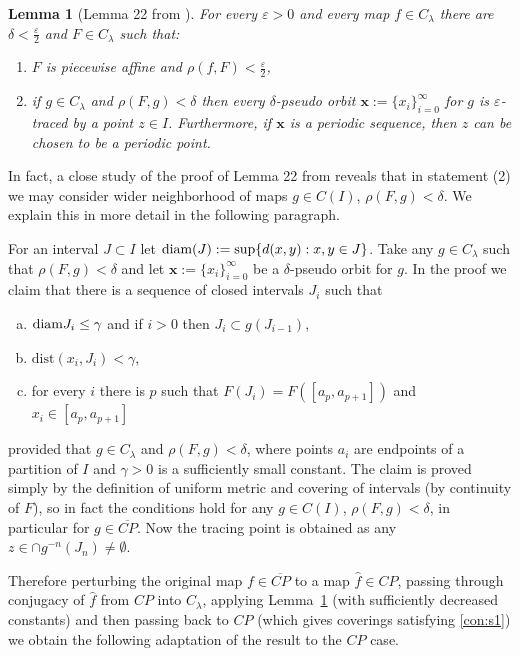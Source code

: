 \documentclass[12pt, a4paper]{amsart}
\newtheorem{lemma}[theorem]{Lemma}
\def\eps{\varepsilon}
\def\diam{\mbox{\rm diam} }
\newcommand{\?}{{\bf ???}}
\def\CP{\overline{CP}}
\begin{document}
\begin{lemma}[Lemma 22 from \cite{BCOT}]\label{lem:shadowingdense}
For every $\eps>0$ and every map $f\in C_\lambda$
 there are
$\delta<\frac{\eps}{2}$ and $F\in C_{\lambda}$ such that:
\begin{enumerate}
\item $F$ is piecewise affine and $\rho(f,F)<\frac{\eps}{2}$,
\item if $g\in C_\lambda$ and $\rho(F,g)<\delta$ then every $\delta$-pseudo orbit $\mathbf{x}:=\{x_i\}_{i=0}^\infty$ for $g$ is $\eps$-traced by a point $z\in I$.
Furthermore, if $\mathbf{x}$ is a periodic sequence, then $z$ can be chosen to be a periodic point.
\end{enumerate}
\end{lemma}

In fact, a close study of the proof  of Lemma 22 from \cite{BCOT} reveals that in statement (2) we may consider wider neighborhood of maps $g\in C(I)$, $\rho(F,g)<\delta$. We explain this in more detail in the following paragraph.

For an interval $J\subset I$ let $\diam(J):=\sup\{d(x,y): x,y\in J\}$.
Take any $g\in C_\lambda$ such that $\rho(F,g)<\delta$ and let $\mathbf{x}:=\{x_i\}_{i=0}^\infty$ be a $\delta$-pseudo orbit for $g$. In the proof we claim that there is a sequence of closed intervals $J_i$ such that
\begin{enumerate}[(a)]
\item $\diam J_i \leq \gamma$ and if $i>0$ then $J_{i}\subset g(J_{i-1})$,\label{con:s1}
\item $\mathrm{dist}(x_{i},J_i)< \gamma$,\label{con:s2}
\item\label{c:3} for every $i$ there is $p$ such that $F(J_i)=F([a_p,a_{p+1}])$ and $x_i\in [a_p,a_{p+1}]$\label{con:s3}
\end{enumerate}
provided that $g\in C_\lambda$ and $\rho(F,g)<\delta$,
where points $a_i$ are endpoints of a partition of $I$ and $\gamma>0$ is a sufficiently small constant.
The claim is proved simply by the definition of uniform metric and covering of intervals (by continuity of $F$), so in fact the conditions hold for any 
$g\in C(I)$, $\rho(F,g)<\delta$, in particular for $g\in \overline{CP}$. Now the tracing point is obtained as any $z\in \cap g^{-n}(J_n)\neq \emptyset$.

Therefore perturbing the original map $f\in \CP$ to a map $\hat{f}\in CP$, passing through conjugacy of $\hat f$ from $CP$ into $C_\lambda$, applying Lemma~\ref{lem:shadowingdense} (with sufficiently decreased constants) and then passing back  to $CP$ (which gives coverings satisfying \ref{con:s1}) we obtain the following adaptation of the result to the $CP$ case. 
\end{document}
